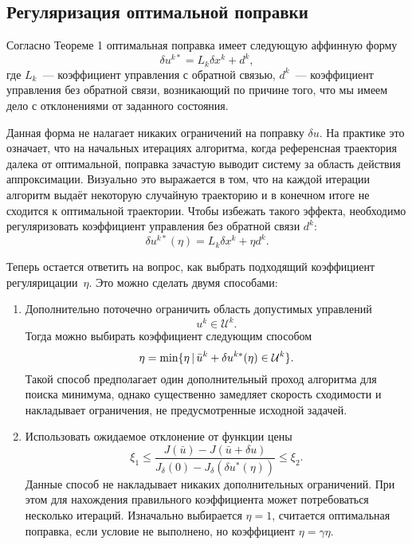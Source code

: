 \documentclass[../../doc.tex]{subfiles}
\begin{document}
    \subsection{Регуляризация оптимальной поправки}

    Согласно Теореме 1 оптимальная поправка имеет следующую аффинную форму
    \begin{equation*}
        \delta u^{k*} = L_k \delta x^k + d^k,
    \end{equation*}
    где $L_k$~--- коэффициент управления с обратной связью, $d^k$~--- коэффициент управления без обратной связи, возникающий по причине того, что мы имеем дело с отклонениями от заданного состояния.

    Данная форма не налагает никаких ограничений на поправку $\delta u$.
    На практике это означает,
        что на начальных итерациях алгоритма,
        когда референсная траектория далека от оптимальной,
        поправка зачастую выводит систему за область действия аппроксимации.
    Визуально это выражается в том, что на каждой итерации алгоритм выдаёт некоторую случайную траекторию и в конечном итоге не сходится к оптимальной траектории.
    Чтобы избежать такого эффекта, необходимо регуляризовать коэффициент управления без обратной связи $d^k$:
    \begin{equation*}
        \delta u^{k*}(\eta) = L_k \delta x^k + \eta d^k.
    \end{equation*}

    Теперь остается ответить на вопрос, как выбрать подходящий коэффициент регулярицации~$\eta$.
    Это можно сделать двумя способами:
    \begin{enumerate}
        \item Дополнительно поточечно ограничить область допустимых управлений
        $$
            u^k \in \mathcal{U}^k.
        $$
        Тогда можно выбирать коэффициент следующим способом
        $$
            \eta = \textnormal{min} \{ \eta \,|\, \bar u^k + \delta u^{k*}(\eta) \in \mathcal{U}^k \}.
        $$
        Такой способ предполагает один дополнительный проход алгоритма для поиска минимума,
        однако существенно замедляет скорость сходимости и накладывает ограничения,
        не предусмотренные исходной задачей.

        \item Использовать ожидаемое отклонение от функции цены
        $$
            \xi_1
            \leqslant
            \frac{J(\bar u) - J(\bar u + \delta u)}{J_{\delta}(0) - J_{\delta}(\delta u^{*}(\eta))}
            \leqslant
            \xi_2.
        $$
        Данные способ не накладывает никаких дополнительных ограничений.
        При этом для нахождения правильного коэффициента может потребоваться несколько итераций.
        Изначально выбирается $\eta=1$, считается оптимальная поправка, если условие не выполнено, но коэффициент $\eta = \gamma \eta$.
    \end{enumerate}

    \ifSubfilesClassLoaded{
        \nocite{*}
        \clearpage
        
        
    }{}
\end{document}
